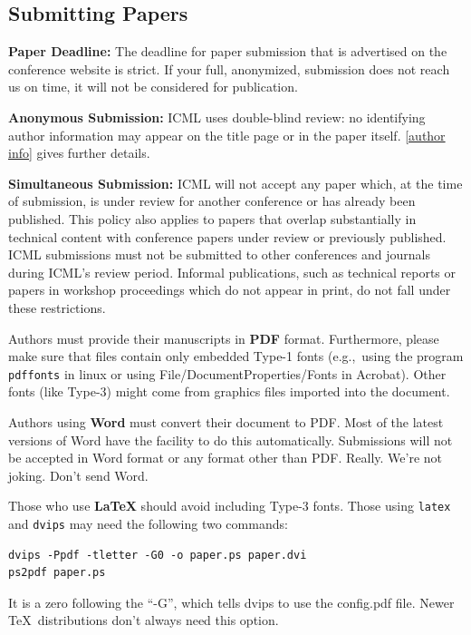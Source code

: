 \documentclass{article}
\theoremstyle{plain}
\theoremstyle{definition}
\theoremstyle{remark}
\begin{document}
\subsection{Submitting Papers}

\textbf{Paper Deadline:} The deadline for paper submission that is
advertised on the conference website is strict. If your full,
anonymized, submission does not reach us on time, it will not be
considered for publication. 

\textbf{Anonymous Submission:} ICML uses double-blind review: no identifying
author information may appear on the title page or in the paper
itself. \cref{author info} gives further details.

\textbf{Simultaneous Submission:} ICML will not accept any paper which,
at the time of submission, is under review for another conference or
has already been published. This policy also applies to papers that
overlap substantially in technical content with conference papers
under review or previously published. ICML submissions must not be
submitted to other conferences and journals during ICML's review
period.
Informal publications, such as technical
reports or papers in workshop proceedings which do not appear in
print, do not fall under these restrictions.

\medskip

Authors must provide their manuscripts in \textbf{PDF} format.
Furthermore, please make sure that files contain only embedded Type-1 fonts
(e.g.,~using the program \texttt{pdffonts} in linux or using
File/DocumentProperties/Fonts in Acrobat). Other fonts (like Type-3)
might come from graphics files imported into the document.

Authors using \textbf{Word} must convert their document to PDF\@. Most
of the latest versions of Word have the facility to do this
automatically. Submissions will not be accepted in Word format or any
format other than PDF\@. Really. We're not joking. Don't send Word.

Those who use \textbf{\LaTeX} should avoid including Type-3 fonts.
Those using \texttt{latex} and \texttt{dvips} may need the following
two commands:

{\footnotesize
\begin{verbatim}
dvips -Ppdf -tletter -G0 -o paper.ps paper.dvi
ps2pdf paper.ps
\end{verbatim}}
It is a zero following the ``-G'', which tells dvips to use
the config.pdf file. Newer \TeX\ distributions don't always need this
option.
\end{document}
